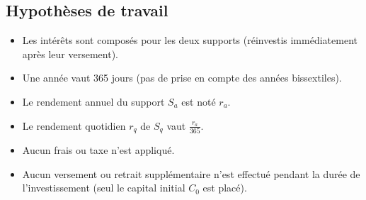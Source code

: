 \documentclass{article}
\begin{document}
\subsection{Hypothèses de travail}
\begin{itemize}
\item Les intérêts sont composés pour les deux supports (réinvestis immédiatement après leur versement).
\item Une année vaut 365 jours (pas de prise en compte des années bissextiles).
\item Le rendement annuel du support $S_a$  est noté $r_a$.
\item Le rendement quotidien $r_q$ de $S_q$ vaut $\frac{r_a}{365}$.
\item Aucun frais ou taxe n'est appliqué.
\item Aucun versement ou retrait supplémentaire n’est effectué pendant la durée de l’investissement (seul le capital initial $C_0$ est placé).
\end{itemize}
\end{document}
